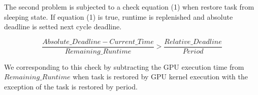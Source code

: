 The second problem is subjected to a check equation (1) when restore task from sleeping state.
If equation (1) is true, runtime is replenished and absolute deadline is setted next cycle deadline.

{\scriptsize
\begin{equation}
\frac{Absolute\_Deadline - Current\_Time}{Remaining\_Runtime} > \frac{Relative\_Deadline}{Period}
\end{equation}
}

We corresponding to this check by
subtracting the GPU execution time from $Remaining\_Runtime$
when task is restored by GPU kernel execution with the exception of the task is restored by period.

